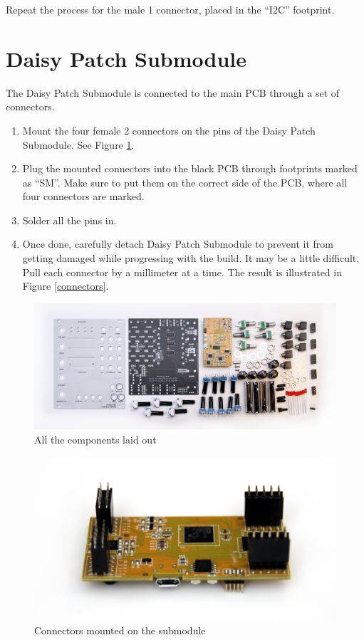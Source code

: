 \documentclass[10pt,a4paper,twocolumn]{article}
\begin{document}
Repeat the process for the male 1 connector, placed in the ``I2C''
footprint.

\section{Daisy Patch Submodule}

The Daisy Patch Submodule is connected to the main PCB through a set of
connectors.

\begin{enumerate}
  \item Mount the four female 2 connectors on the pins of the Daisy
    Patch Submodule. See Figure \ref{daisy}.
  \item Plug the mounted connectors into the black PCB through
    footprints marked as ``SM''. Make sure to put them on the correct side
    of the PCB, where all four connectors are marked.
  \item Solder all the pins in.
  \item Once done, carefully detach Daisy Patch Submodule to prevent it
    from getting damaged while progressing with the build. It may be a
    little difficult. Pull each connector by a millimeter at a time.
    The result is illustrated in Figure \ref{connectors}.
\end{enumerate}

\begin{figure}[h]
  \centering
  \includegraphics[width=\linewidth]{p01.jpg}
  \caption{All the components laid out}
\end{figure}

\begin{figure}[h]
  \centering
  \includegraphics[width=\linewidth]{p02.jpg}
  \caption{Connectors mounted on the submodule}
  \label{daisy}
\end{figure}
\end{document}
